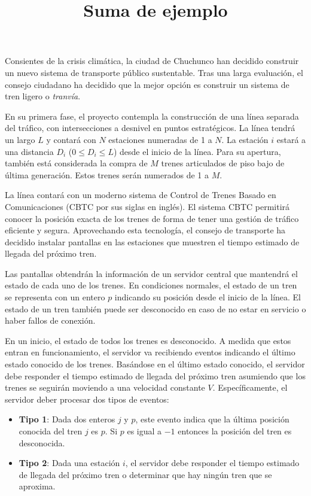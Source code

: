 \documentclass{oci}
\title{Suma de ejemplo}
\begin{document}
\begin{problemDescription}
  Consientes de la crisis climática, la ciudad de Chuchunco
  han decidido construir un nuevo sistema de transporte
  público sustentable.
  Tras una larga evaluación, el consejo ciudadano
  ha decidido que la mejor opción es construir un
  sistema de tren ligero o \emph{tranvía}.

  En su primera fase, el proyecto contempla la
  construcción de una línea separada del tráfico, con
  intersecciones a desnivel en puntos estratégicos.
  La línea tendrá un largo $L$ y contará con $N$
  estaciones numeradas de 1 a $N$.
  La estación $i$ estará a una distancia $D_i$
  ($0 \leq D_i \leq L$) desde el inicio de la línea.
  Para su apertura, también está considerada la
  compra de $M$ trenes articulados de piso bajo
  de última generación.
  Estos trenes serán numerados de 1 a $M$.

  La línea contará con un moderno sistema de
  Control de Trenes Basado en Comunicaciones
  (CBTC por sus siglas en inglés).
  El sistema CBTC permitirá conocer la posición
  exacta de los trenes de forma de tener una
  gestión de tráfico eficiente y segura.
  Aprovechando esta tecnología, el consejo de
  transporte ha decidido instalar pantallas en las
  estaciones que muestren el tiempo estimado de
  llegada del próximo tren.

  Las pantallas obtendrán la información de un
  servidor central que mantendrá el estado
  de cada uno de los trenes.
  En condiciones normales, el estado de un tren
  se representa con un entero $p$ indicando
  su posición desde el inicio de la línea.
  El estado de un tren también puede ser desconocido
  en caso de no estar en servicio o haber fallos
  de conexión.

  En un inicio, el estado de todos los trenes es
  desconocido.
  A medida que estos entran en funcionamiento, el
  servidor va recibiendo eventos indicando el
  último estado conocido de los trenes.
  Basándose en el último estado conocido, el servidor
  debe responder el tiempo estimado de llegada del
  próximo tren asumiendo que los trenes se seguirán
  moviendo a una velocidad constante $V$.
  Específicamente, el servidor deber procesar dos tipos
  de eventos:
  \begin{itemize}
    \item \textbf{Tipo 1}: Dada dos enteros $j$ y $p$, este evento
    indica que la última posición conocida del tren $j$ es $p$.
    Si $p$ es igual a $-1$ entonces la posición del tren es desconocida.
    \item \textbf{Tipo 2}: Dada una estación $i$, el servidor debe
    responder el tiempo estimado de llegada del próximo tren o determinar
    que hay ningún tren que se aproxima.
  \end{itemize}
\end{problemDescription}
\end{document}
